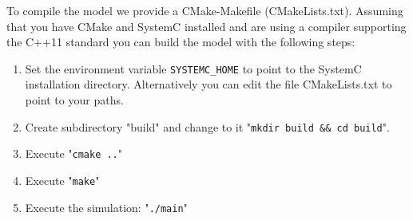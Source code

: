 \documentclass{template/openetcs_article}
\begin{document}
To compile the model we provide a CMake-Makefile (CMakeLists.txt). Assuming that you have CMake and SystemC installed and are using a compiler supporting the C++11 standard you can build the model with the following steps:

\begin{enumerate}
  \item Set the environment variable \verb|SYSTEMC_HOME| to point to the SystemC installation directory. Alternatively you can edit the file CMakeLists.txt to point to your paths. 
  \item Create subdirectory "build" and change to it "\verb|mkdir build && cd build|". 
  \item Execute "\verb|cmake ..|" 
  \item Execute "\verb|make|" 
  \item Execute the simulation: "\verb|./main|" 
\end{enumerate}



\end{document}

